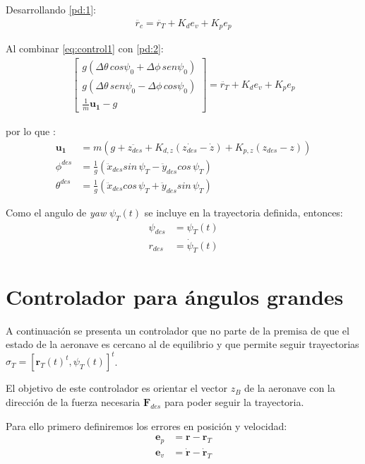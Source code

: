 Desarrollando \ref{pd:1}:
\begin{align}
	\label{pd:2}
	\ddot{r_c} = \ddot{r_T} + K_d e_v + K_p e_p
\end{align}

Al combinar \ref{eq:control1} con \ref{pd:2}:
\begin{align}\begin{bmatrix}
		g (\Delta\theta\, cos \psi_0 + \Delta\phi\,sen\psi_0)\\
		g(\Delta\theta\, sen \psi_0  - \Delta\phi\,cos\psi_0) \\
		\frac{1}{m}\mathbf{u_1}-g
	\end{bmatrix} 	= \ddot{r_T} + K_d e_v + K_p e_p
\end{align}

por lo que :
\begin{align}
	\mathbf{u_1} &=m\left(g + \ddot{z_{des}}+ K_{d,z}(\dot{z_{des}}-\dot{z}) + K_{p,z}(z_{des}-z)\right)\\
	\phi^{des} &= \frac{1}{g}\left(\ddot{x}_{des} sin\,\psi_T -\ddot{y}_{des} cos\,\psi_T \right)\\
	\theta^{des} &= \frac{1}{g}\left(\ddot{x}_{des} cos\,\psi_T +\ddot{y}_{des} sin\,\psi_T \right)
\end{align}

Como el angulo de \textit{yaw} $\psi_T(t)$ se incluye en la trayectoria definida, entonces:
\begin{align}
	\psi_{des} &= \psi_T(t)\\
	r_{des} &= \dot\psi_T(t)
\end{align} 


\section{Controlador para ángulos grandes}
A continuación se presenta un controlador que no parte de la premisa de que el estado de la aeronave es cercano al de equilibrio y que permite seguir trayectorias $\sigma_T = [\mathbf{r}_T(t)^t, \psi_T(t)]^t$.

El objetivo de este controlador es orientar el vector $z_B$ de la aeronave con la dirección de la fuerza necesaria $\mathbf{F}_{des}$ para poder seguir la trayectoria.

Para ello primero definiremos los errores en posición y velocidad:
\begin{align}
	\mathbf{e}_p &= \mathbf{r} -\mathbf{r}_T\\
	\mathbf{e}_v &= \mathbf{\dot r} -\mathbf{\dot r}_T
\end{align} 

